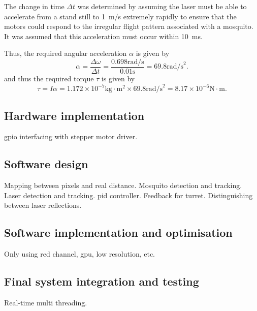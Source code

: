 The change in time $\Delta t$ was determined by assuming the laser must be able to accelerate from a stand still to 1~m/s extremely rapidly to ensure that the motors could respond to the irregular flight pattern associated with a mosquito. It was assumed that this acceleration must occur within 10~ms.

Thus, the required angular acceleration $\alpha$ is given by
\begin{equation}
    \alpha = \frac{\Delta\omega}{\Delta t} = \frac{0.698 \text{rad/s}}{0.01 \text{s}} = 69.8 \text{rad/s}^2.
    \label{eq:angular_acceleration_calculation}
\end{equation}
and thus the required torque $\tau$ is given by
\begin{equation}
    \tau = I\alpha = 1.172 \times 10^{-7} \text{kg} \cdot \text{m}^2 \times 69.8 \text{rad/s}^2 = 8.17 \times 10^{-6} \text{N} \cdot \text{m}.
    \label{eq:torque_calculation}
\end{equation}


\subsection{Hardware implementation}
\gls{gpio} interfacing with stepper motor driver.


\subsection{Software design}
Mapping between pixels and real distance. Mosquito detection and tracking. Laser detection and tracking. \gls{pid} controller. Feedback for turret. Distinguishing between laser reflections.


\subsection{Software implementation and optimisation}
Only using red channel, \gls{gpu}, low resolution, etc.


\subsection{Final system integration and testing}
Real-time multi threading.

\newpage


